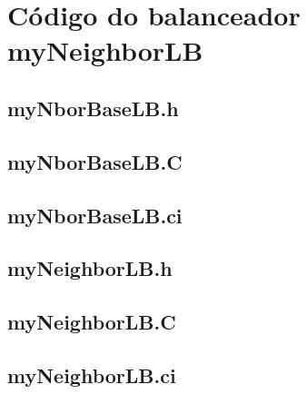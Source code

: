 \chapter{Código do balanceador myNeighborLB}
\label{apd:lb}

\section{myNborBaseLB.h}

\clearpage

\section{myNborBaseLB.C}

\clearpage

\section{myNborBaseLB.ci}

\clearpage

\section{myNeighborLB.h}

\clearpage

\section{myNeighborLB.C}

\clearpage

\section{myNeighborLB.ci}


